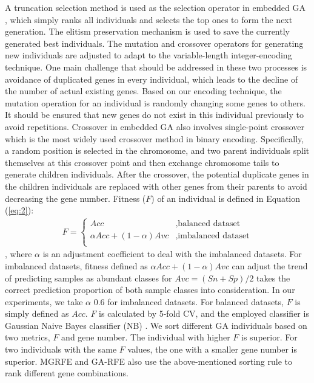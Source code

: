 \documentclass[10pt,journal,compsoc]{IEEEtran}
\begin{document}
	A truncation selection method is used as the selection operator in embedded GA \cite{P37}, which simply ranks all individuals and selects the top ones to form the next generation. The elitism preservation mechanism is used to save the currently generated best individuals. The mutation and crossover operators for generating new individuals are adjusted to adapt to the variable-length integer-encoding technique. One main challenge that should be addressed in these two processes is avoidance of duplicated genes in every individual, which leads to the decline of the number of actual existing genes. Based on our encoding technique, the mutation operation for an individual is randomly changing some genes to others. It should be ensured that new genes do not exist in this individual previously to avoid repetitions. Crossover in embedded GA also involves single-point crossover which is the most widely used crossover method in binary encoding. Specifically, a random position is selected in the chromosome, and two parent individuals split themselves at this crossover point and then exchange chromosome tails to generate children individuals. After the crossover, the potential duplicate genes in the children individuals are replaced with other genes from their parents to avoid decreasing the gene number. Fitness (\(F\)) of an individual is defined in Equation (\ref{eq:2}):
	{
		\scriptsize
		\begin{eqnarray}\label{eq:2}
		F = \left\{
		\begin{array}{cl}
		Acc & {,\text{balanced\ dataset}}\\
		\alpha Acc + (1-\alpha)Avc & {,\text{imbalanced\ dataset}}\\
		\end{array} \right.
		\end{eqnarray}
	}
	, where \(\alpha\) is an adjustment coefficient to deal with the imbalanced datasets. For imbalanced datasets, fitness defined as \(\alpha Acc +(1-\alpha)Avc\) can adjust the trend of predicting samples as abundant classes for \(Avc = (Sn + Sp) \big/ 2\) takes the correct prediction proportion of both sample classes into consideration. In our experiments, we take \(\alpha\) 0.6 for imbalanced datasets. For balanced datasets, \(F\) is simply defined as \(Acc\). \(F\) is calculated by 5-fold CV, and the employed classifier is Gaussian Naive Bayes classifier (NB) \cite{P35}. We sort different GA individuals based on two metrics, \(F\) and gene number. The individual with higher \(F\) is superior. For two individuals with the same \(F\) values, the one with a smaller gene number is superior. MGRFE and GA-RFE also use the above-mentioned sorting rule to rank different gene combinations.
	
\end{document}
